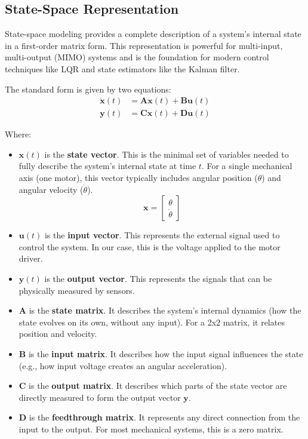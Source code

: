 \documentclass[12pt]{article}
\begin{document}
\subsection{State-Space Representation}

State-space modeling provides a complete description of a system's internal state in a first-order matrix form. This representation is powerful for multi-input, multi-output (MIMO) systems and is the foundation for modern control techniques like LQR and state estimators like the Kalman filter.

The standard form is given by two equations:
\begin{align}
    \dot{\mathbf{x}}(t) &= \mathbf{A}\mathbf{x}(t) + \mathbf{B}\mathbf{u}(t) \label{eq:state_equation} \\
    \mathbf{y}(t) &= \mathbf{C}\mathbf{x}(t) + \mathbf{D}\mathbf{u}(t) \label{eq:output_equation}
\end{align}

Where:
\begin{itemize}
    \item \(\mathbf{x}(t)\) is the \textbf{state vector}. This is the minimal set of variables needed to fully describe the system's internal state at time \(t\). For a single mechanical axis (one motor), this vector typically includes angular position (\(\theta\)) and angular velocity (\(\dot{\theta}\)).
    \begin{equation*}
        \mathbf{x} = \begin{bmatrix} \theta \\ \dot{\theta} \end{bmatrix}
    \end{equation*}

    \item \(\mathbf{u}(t)\) is the \textbf{input vector}. This represents the external signal used to control the system. In our case, this is the voltage applied to the motor driver.

    \item \(\mathbf{y}(t)\) is the \textbf{output vector}. This represents the signals that can be physically measured by sensors.

    \item \(\mathbf{A}\) is the \textbf{state matrix}. It describes the system's internal dynamics (how the state evolves on its own, without any input). For a 2x2 matrix, it relates position and velocity.

    \item \(\mathbf{B}\) is the \textbf{input matrix}. It describes how the input signal influences the state (e.g., how input voltage creates an angular acceleration).

    \item \(\mathbf{C}\) is the \textbf{output matrix}. It describes which parts of the state vector are directly measured to form the output vector \(\mathbf{y}\).

    \item \(\mathbf{D}\) is the \textbf{feedthrough matrix}. It represents any direct connection from the input to the output. For most mechanical systems, this is a zero matrix.
\end{itemize}
\end{document}
